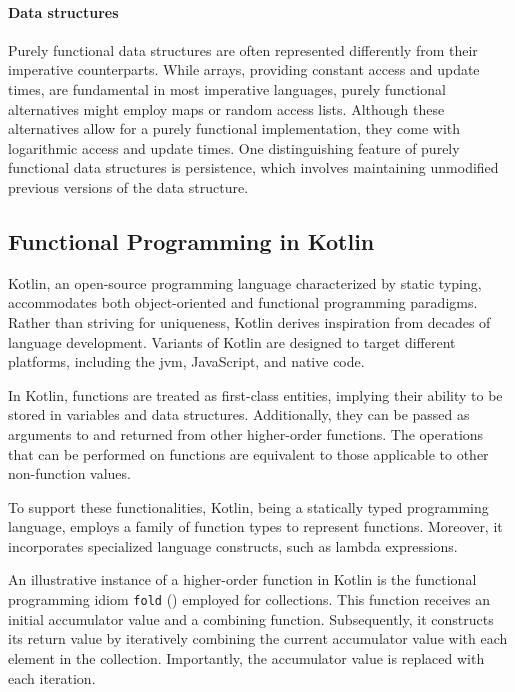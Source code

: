\paragraph{Data structures}

Purely functional data structures are often represented differently from their imperative counterparts. While arrays, providing constant access and update times, are fundamental in most imperative languages, purely functional alternatives might employ maps or random access lists. Although these alternatives allow for a purely functional implementation, they come with logarithmic access and update times. One distinguishing feature of purely functional data structures is persistence, which involves maintaining unmodified previous versions of the data structure.

\subsection{Functional Programming in Kotlin}

Kotlin, an open-source programming language characterized by static typing, accommodates both object-oriented and functional programming paradigms. Rather than striving for uniqueness, Kotlin derives inspiration from decades of language development. Variants of Kotlin are designed to target different platforms, including the \ac{jvm}, JavaScript, and native code.

In Kotlin, functions are treated as first-class entities, implying their ability to be stored in variables and data structures. Additionally, they can be passed as arguments to and returned from other higher-order functions. The operations that can be performed on functions are equivalent to those applicable to other non-function values.

To support these functionalities, Kotlin, being a statically typed programming language, employs a family of function types to represent functions. Moreover, it incorporates specialized language constructs, such as lambda expressions.

An illustrative instance of a higher-order function in Kotlin is the functional programming idiom \texttt{fold} ()
employed for collections. This function receives an initial accumulator value and a combining function. Subsequently, it constructs its return value by iteratively combining the current accumulator value with each element in the collection. Importantly, the accumulator value is replaced with each iteration.

